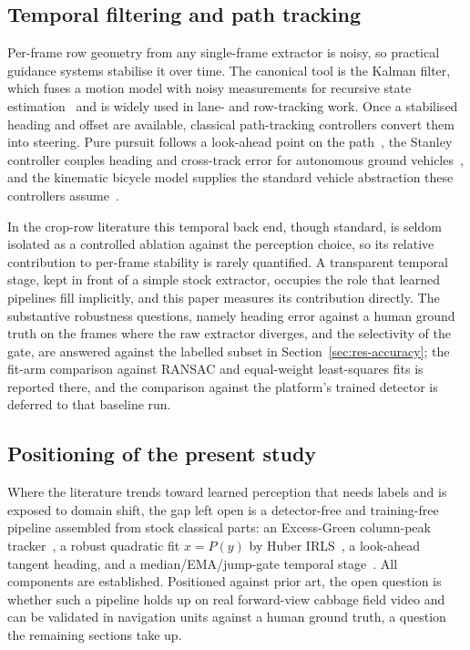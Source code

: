 \subsection{Temporal filtering and path tracking}
\label{subsec:rw_temporal}
Per-frame row geometry from any single-frame extractor is noisy, so practical
guidance systems stabilise it over time. The canonical tool is the Kalman
filter, which fuses a motion model with noisy measurements for recursive state
estimation~\cite{kalman1960} and is widely used in lane- and row-tracking work.
Once a stabilised heading and offset are available, classical path-tracking
controllers convert them into steering. Pure pursuit follows a look-ahead point
on the path~\cite{coulter1992}, the Stanley controller couples heading and
cross-track error for autonomous ground vehicles~\cite{stanley2006}, and the
kinematic bicycle model supplies the standard vehicle abstraction these
controllers assume~\cite{rajamani2012}.

In the crop-row literature this temporal back end, though standard, is seldom
isolated as a controlled ablation against the perception choice, so its relative
contribution to per-frame stability is rarely quantified. A transparent temporal
stage, kept in front of a simple stock extractor, occupies the role that learned
pipelines fill implicitly, and this paper measures its contribution directly. The substantive robustness questions, namely heading error
against a human ground truth on the frames where the raw extractor diverges, and
the selectivity of the gate, are answered against the labelled subset in
Section~\ref{sec:res-accuracy}; the fit-arm comparison against RANSAC and
equal-weight least-squares fits is reported there, and the comparison against the
platform's trained detector is deferred to that baseline run.

\subsection{Positioning of the present study}
\label{subsec:rw_position}
Where the literature trends toward learned perception that needs labels and is
exposed to domain shift, the gap left open is a detector-free and training-free
pipeline assembled from stock classical parts: an Excess-Green column-peak
tracker~\cite{woebbecke1995,meyer2008,otsu1979}, a robust quadratic fit $x=P(y)$
by Huber IRLS~\cite{huber1964}, a look-ahead tangent heading, and a
median/EMA/jump-gate temporal stage~\cite{kalman1960}. All components are
established. Positioned against prior art, the open question is whether
such a pipeline holds up on real forward-view cabbage field video and can be
validated in navigation units against a human ground truth, a question the
remaining sections take up.